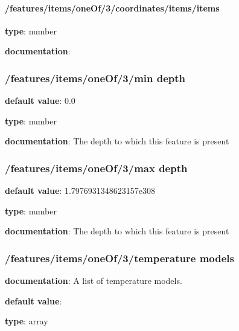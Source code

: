 \begin{itemized}
\begin{itemized}
\paragraph{/features/items/oneOf/3/coordinates/items/items} \begin{itemized}
\item {\bf type}: number
\end{itemized}\item {\bf documentation}: 
\end{itemized}\end{itemized}\subsubsection{/features/items/oneOf/3/min depth} \begin{itemized}
\item {\bf default value}: 0.0
\item {\bf type}: number
\item {\bf documentation}: The depth to which this feature is present
\end{itemized}\subsubsection{/features/items/oneOf/3/max depth} \begin{itemized}
\item {\bf default value}: 1.7976931348623157e308
\item {\bf type}: number
\item {\bf documentation}: The depth to which this feature is present
\end{itemized}\subsubsection{/features/items/oneOf/3/temperature models} \begin{itemized}
\item {\bf documentation}: A list of temperature models.
\item {\bf default value}: 
\item {\bf type}: array

\end{itemized}
